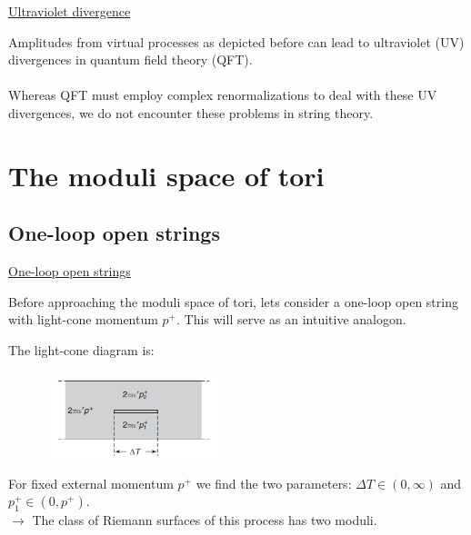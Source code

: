 \documentclass[11pt,aspectratio=169]{beamer}
\begin{document}
\begin{frame}{\underline{Ultraviolet divergence}}

	Amplitudes from virtual processes as depicted before can lead to ultraviolet (UV) divergences in quantum field theory (QFT).
	\\~\\
	Whereas QFT must employ complex renormalizations to deal with these UV divergences, we do not encounter these problems in string theory.
	
\end{frame}



\section{The moduli space of tori}

\subsection{One-loop open strings}

\begin{frame}[fragile]{\underline{One-loop open strings}}

	Before approaching the moduli space of tori, lets consider a one-loop open string with light-cone momentum $p^{+}$. This will serve as an intuitive analogon.

	The light-cone diagram is:
	\begin{figure}[htbp]
		\centering
		\includegraphics[width = 0.45\textwidth]{elements/one-loop open string.PNG}
	\end{figure}

	For fixed external momentum $p^+$ we find the two parameters: $\Delta T \in (0, \infty)$ and $p_{1}^{+} \in (0, p^+)$.
	\\
	$\rightarrow$ The class of Riemann surfaces of this process has two moduli.

\end{frame}
\end{document}

